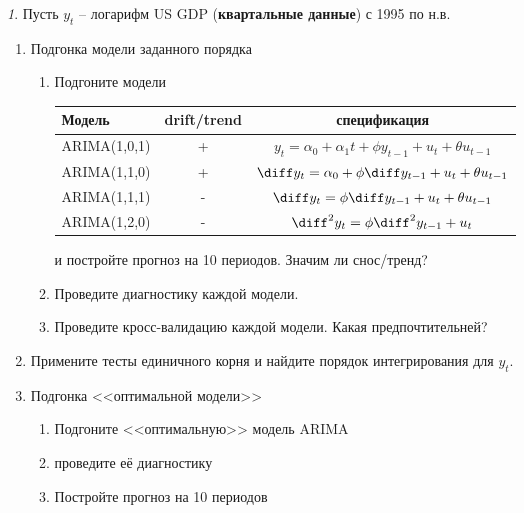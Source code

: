 \documentclass[12pt]{article}
\theoremstyle{remark}
\newtheorem{exercise}{}[subsection]
\begin{document}
\begin{exercise}
Пусть \(y_t\) -- логарифм US GDP (\textbf{квартальные данные}) с 1995 по н.в.
\begin{enumerate}
	\item Подгонка модели заданного порядка
	\begin{enumerate}
		\item Подгоните модели
		\begin{center}\small
		\begin{tabular}{l|c|c}
			Модель & drift/trend  & спецификация\\ \hline
			ARIMA(1,0,1) & + & \(y_t=\alpha_0+\alpha_1t+\phi y_{t-1}+u_t+\theta u_{t-1}\)\\
			ARIMA(1,1,0) & + & \(\diff y_t=\alpha_0+\phi\diff y_{t-1}+u_t+\theta u_{t-1}\)\\
			ARIMA(1,1,1) & - & \(\diff y_t=\phi\diff y_{t-1}+u_t+\theta u_{t-1}\) \\
			ARIMA(1,2,0) & - & \(\diff^2 y_t=\phi\diff^2 y_{t-1}+u_t\)\\ \hline
		\end{tabular}
		\end{center} 
		и постройте прогноз на 10 периодов. Значим ли снос/тренд?
		\item Проведите диагностику каждой модели.
		\item Проведите кросс-валидацию каждой модели. Какая предпочтительней?
	\end{enumerate}
	\item Примените тесты единичного корня и найдите порядок интегрирования для \(y_t\). 
	\item Подгонка <<оптимальной модели>>
	\begin{enumerate}
		\item Подгоните <<оптимальную>> модель ARIMA
		\item проведите её диагностику
		\item Постройте прогноз на 10 периодов
	\end{enumerate}
\end{enumerate}
\end{exercise}

\end{document}
